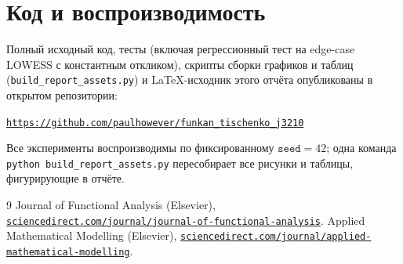 \documentclass[12pt,a4paper]{article}
\theoremstyle{definition}
\theoremstyle{remark}
\begin{document}
\section*{Код и воспроизводимость}

Полный исходный код, тесты (включая регрессионный тест на edge-case LOWESS
с константным откликом), скрипты сборки графиков и таблиц
(\texttt{build\_report\_assets.py}) и LaTeX-исходник этого отчёта опубликованы
в открытом репозитории:
\begin{center}
    \href{https://github.com/paulhowever/funkan_tischenko_j3210}%
         {\texttt{https://github.com/paulhowever/funkan\_tischenko\_j3210}}
\end{center}
Все эксперименты воспроизводимы по фиксированному
$\texttt{seed}=42$; одна команда \texttt{python build\_report\_assets.py}
пересобирает все рисунки и таблицы, фигурирующие в отчёте.

\renewcommand{\refname}{Литература}
\begin{thebibliography}{9}
\small
{}
Journal of Functional Analysis (Elsevier),
\href{https://www.sciencedirect.com/journal/journal-of-functional-analysis}%
     {\texttt{sciencedirect.com/journal/journal-of-functional-analysis}}.
Applied Mathematical Modelling (Elsevier),
\href{https://www.sciencedirect.com/journal/applied-mathematical-modelling}%
     {\texttt{sciencedirect.com/journal/applied-mathematical-modelling}}.
\end{thebibliography}
\end{document}
